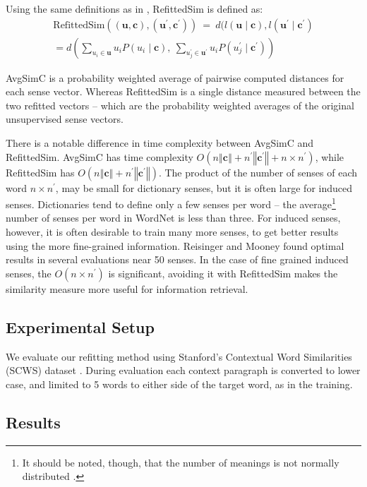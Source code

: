 \documentclass{article}
\def\parencite{\cite}
\renewcommand{\c}{\mathbf{c}}
\renewcommand{\u}{\mathbf{u}}
\begin{document}
Using the same definitions as in , RefittedSim is defined as:
\begin{multline} \label{eq:refittedsim}
\mathrm{RefittedSim}((\u,\c),(\u^{\prime},\c^{\prime}))
\:=\: d(l(\u \mid \c), l(\u^\prime \mid \c^\prime)\\
= d\left(
\sum_{u_{i}\in\u}u_{i}P(u_{i}\mid\c),\:
\sum_{u_{j}^{\prime}\in\u^{\prime}}u_{i}P(u_{j}^{\prime}\mid\c^{\prime})\right)
\end{multline}

AvgSimC is a probability weighted average of pairwise computed distances for each sense vector.
Whereas RefittedSim is a single distance measured between the two refitted vectors -- which are the probability weighted averages of the original unsupervised sense vectors.


There is a notable difference in time complexity between AvgSimC and RefittedSim.
AvgSimC has time complexity $O(n\left\Vert \c\right\Vert +n^{\prime}\left\Vert \c^{\prime}\right\Vert +n\times n^{\prime})$,
while RefittedSim has $O(n\left\Vert \c\right\Vert +n^{\prime}\left\Vert \c^{\prime}\right\Vert)$.
The product of the number of senses of each word $n \times n^\prime$, may be small for dictionary senses, but it is often large for induced senses. Dictionaries tend to define only a few senses per word -- the average\footnote{It should be noted, though, that the number of meanings is not normally distributed \parencite{zipf1945meaning}.} number of senses per word in WordNet is less than three\parencite{miller1995wordnet}. For induced senses, however, it is often desirable to train many more senses, to get better results using the more fine-grained information. Reisinger and Mooney  found optimal results in several evaluations near 50 senses.
In the case of fine grained induced senses, the $O(n \times n^\prime)$ is significant, avoiding it with RefittedSim makes the similarity measure more useful for information retrieval.

\subsection{Experimental Setup}
We evaluate our refitting method using Stanford's Contextual Word Similarities (SCWS) dataset \parencite{Huang2012}.
During evaluation each context paragraph is converted to lower case, and limited to 5 words to either side of the target word, as in the training.


\subsection{Results}
\end{document}
